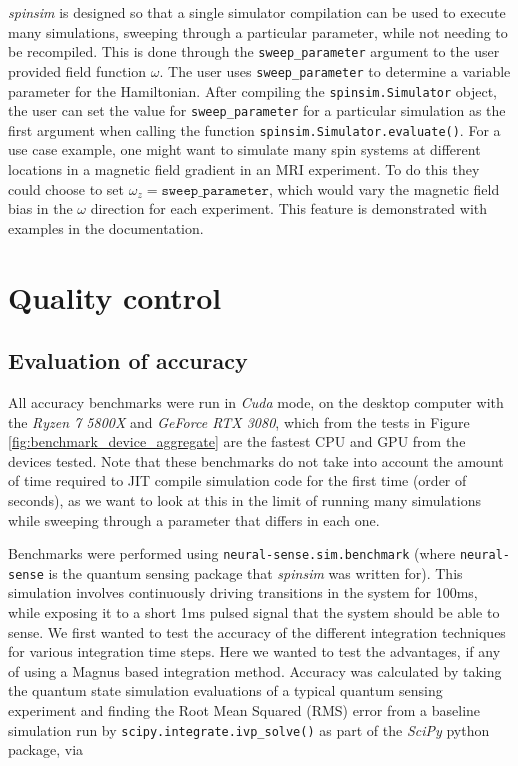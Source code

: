 \documentclass{jors}
\begin{document}
		\emph{spinsim} is designed so that a single simulator compilation can be used to execute many simulations, sweeping through a particular parameter, while not needing to be recompiled.
		This is done through the \texttt{sweep\_parameter} argument to the user provided field function \(\omega\).
		The user uses \texttt{sweep\_parameter} to determine a variable parameter for the Hamiltonian.
		After compiling the \texttt{spinsim.Simulator} object, the user can set the value for \texttt{sweep\_parameter} for a particular simulation as the first argument when calling the function \texttt{spinsim.Simulator.evaluate()}.
		For a use case example, one might want to simulate many spin systems at different locations in a magnetic field gradient in an MRI experiment.
		To do this they could choose to set \(\omega_z =\texttt{sweep\_parameter}\), which would vary the magnetic field bias in the \(\omega\) direction for each experiment.
		This feature is demonstrated with examples in the documentation.

\section{Quality control}
	\subsection{Evaluation of accuracy}
	All accuracy benchmarks were run in \emph{Cuda} mode, on the desktop computer with the \emph{Ryzen 7 5800X} and \emph{GeForce RTX 3080}, which from the tests in Figure \ref{fig:benchmark_device_aggregate} are the fastest CPU and GPU from the devices tested.
	Note that these benchmarks do not take into account the amount of time required to JIT compile simulation code for the first time (order of seconds), as we want to look at this in the limit of running many simulations while sweeping through a parameter that differs in each one.
	
	Benchmarks were performed using \texttt{neural-sense.sim.benchmark} (where \texttt{neural-sense} \cite{alexander-tritt-monash_alexander-tritt-monashneural-sense_2020} is the quantum sensing package that \emph{spinsim} was written for).
	This simulation involves continuously driving transitions in the system for 100ms, while exposing it to a short 1ms pulsed signal that the system should be able to sense.
	We first wanted to test the accuracy of the different integration techniques for various integration time steps.
	Here we wanted to test the advantages, if any of using a Magnus based integration method.
	Accuracy was calculated by taking the quantum state simulation evaluations of a typical quantum sensing experiment and finding the Root Mean Squared (RMS) error from a baseline simulation run by \texttt{scipy.integrate.ivp\_solve()} as part of the \emph{SciPy} python package, via
\end{document}

